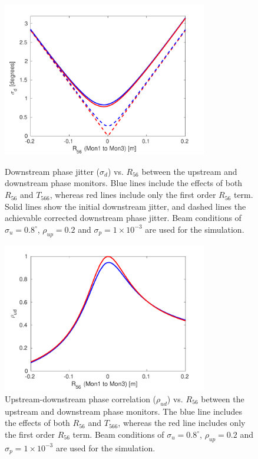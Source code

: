 \begin{figure}
  \centering
  \includegraphics[width=0.8\textwidth]{Figures/propagation/jitVsR56_t566}
  \caption{Downstream phase jitter (\(\sigma_d\)) vs. \(R_{56}\) between the upstream and downstream phase monitors. Blue lines include the effects of both \(R_{56}\) and \(T_{566}\), whereas red lines include only the first order \(R_{56}\) term. Solid lines show the initial downstream jitter, and dashed lines the achievable corrected downstream phase jitter. Beam conditions of \(\sigma_u = 0.8^\circ\), \(\rho_{up}=0.2\) and \(\sigma_p = 1 \times 10^{-3}\) are used for the simulation.}
  \label{f:jitVsR56_t566}
  \includegraphics[width=0.8\textwidth]{Figures/propagation/corrVsR56_t566}
  \caption{Upstream-downstream phase correlation (\(\rho_{ud}\)) vs. \(R_{56}\) between the upstream and downstream phase monitors. The blue line includes the effects of both \(R_{56}\) and \(T_{566}\), whereas the red line includes only the first order \(R_{56}\) term.  Beam conditions of \(\sigma_u = 0.8^\circ\), \(\rho_{up}=0.2\) and \(\sigma_p = 1 \times 10^{-3}\) are used for the simulation.}
  \label{f:corrVsR56_t566}
\end{figure}



